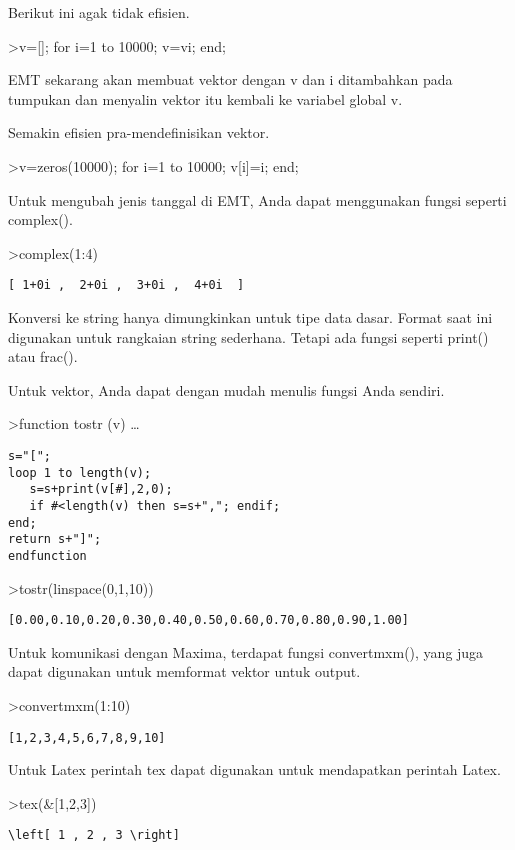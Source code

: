 \documentclass[
]{book}
\begin{document}
Berikut ini agak tidak efisien.

\textgreater v={[}{]}; for i=1 to 10000; v=v\textbar i; end;

EMT sekarang akan membuat vektor dengan v dan i ditambahkan pada tumpukan dan menyalin vektor itu kembali ke variabel global v.

Semakin efisien pra-mendefinisikan vektor.

\textgreater v=zeros(10000); for i=1 to 10000; v{[}i{]}=i; end;

Untuk mengubah jenis tanggal di EMT, Anda dapat menggunakan fungsi seperti complex().

\textgreater complex(1:4)

\begin{verbatim}
[ 1+0i ,  2+0i ,  3+0i ,  4+0i  ]
\end{verbatim}

Konversi ke string hanya dimungkinkan untuk tipe data dasar. Format saat ini digunakan untuk rangkaian string sederhana. Tetapi ada fungsi seperti print() atau frac().

Untuk vektor, Anda dapat dengan mudah menulis fungsi Anda sendiri.

\textgreater function tostr (v) \ldots{}

\begin{verbatim}
s="[";
loop 1 to length(v);
   s=s+print(v[#],2,0);
   if #<length(v) then s=s+","; endif;
end;
return s+"]";
endfunction
\end{verbatim}

\textgreater tostr(linspace(0,1,10))

\begin{verbatim}
[0.00,0.10,0.20,0.30,0.40,0.50,0.60,0.70,0.80,0.90,1.00]
\end{verbatim}

Untuk komunikasi dengan Maxima, terdapat fungsi convertmxm(), yang juga dapat digunakan untuk memformat vektor untuk output.

\textgreater convertmxm(1:10)

\begin{verbatim}
[1,2,3,4,5,6,7,8,9,10]
\end{verbatim}

Untuk Latex perintah tex dapat digunakan untuk mendapatkan perintah Latex.

\textgreater tex(\&{[}1,2,3{]})

\begin{verbatim}
\left[ 1 , 2 , 3 \right] 
\end{verbatim}
\end{document}
